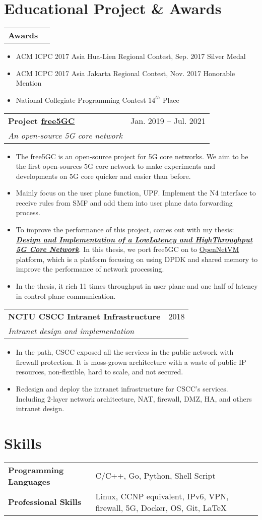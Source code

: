 \documentclass[letterpaper,11pt]{article}
\makeatletter
\newcommand{\resumeItemTwo}[1]{
  \item\small{
    {#1 \vspace{-2pt}}
  }
}
\newcommand{\resumeSubheading}[4]{
  \vspace{1pt}%
    \begin{tabular*}{0.97\textwidth}{l@{\extracolsep{\fill}}r}
      \textbf{#1} & #2 \\
      \textit{\small#3} & \textit{\small #4} \\
    \end{tabular*}\vspace{-5pt}
}
\newcommand{\resumeSubheadingOne}[2]{
  \vspace{-1pt}%
    \begin{tabular*}{0.97\textwidth}{l@{\extracolsep{\fill}}r}
      \textbf{#1} & #2 \\
    \end{tabular*}\vspace{-5pt}
}
\newcommand{\resumeSubHeadingListStart}{}%
\newcommand{\resumeSubHeadingListEnd}{}%
\newcommand{\resumeItemListStart}{\begin{itemize}}
\newcommand{\resumeItemListEnd}{\end{itemize}\vspace{-5pt}}
\makeatother
\begin{document}
\section{Educational Project \& Awards}
  \resumeSubHeadingListStart
     \resumeSubheadingOne
     {Awards}{}
      \resumeItemListStart
        \resumeItemTwo{ACM ICPC 2017 Asia Hua-Lien Regional Contest, Sep. 2017}{Silver Medal}
        \resumeItemTwo{ACM ICPC 2017 Asia Jakarta Regional Contest, Nov. 2017}{Honorable Mention}
        \resumeItemTwo{National Collegiate Programming Contest}{$14^{th}$ Place}
      \resumeItemListEnd
    \resumeSubheading
     {Project \href{https://www.free5gc.org/}{free5GC}}{Jan. 2019 -- Jul. 2021}
      {An open-source 5G core network}{}
      \resumeItemListStart
        \resumeItemTwo{The free5GC is an open-source project for 5G core networks. We aim to be the first open-sources 5G core network to make experiments and developments on 5G core quicker and easier than before.}
        \resumeItemTwo{Mainly focus on the user plane function, UPF. Implement the N4 interface to receive rules from SMF and add them into user plane data forwarding process.}
        \resumeItemTwo{To improve the performance of this project, comes out with my thesis: \textbf{\textit{\href{https://hdl.handle.net/11296/44vnys}{Design and Implementation of a Low­Latency and High­Throughput 5G Core Network}}}. In this thesis, we port free5GC on to \href{http://sdnfv.github.io/onvm/}{OpenNetVM} platform, which is a platform focusing on using DPDK and shared memory to improve the performance of network processing.}
        \resumeItemTwo{In the thesis, it rich 11 times throughput in user plane and one half of latency in control plane communication.}
      \resumeItemListEnd
    \resumeSubheading
     {NCTU CSCC Intranet Infrastructure}{2018}
      {Intranet design and implementation}{}
      \resumeItemListStart
        \resumeItemTwo{In the path, CSCC exposed all the services in the public network with firewall protection. It is moss-grown architecture with a waste of public IP resources, non-flexible, hard to scale, and not secured.}
        \resumeItemTwo{Redesign and deploy the intranet infrastructure for CSCC's services. Including 2-layer network architecture, NAT, firewall, DMZ, HA, and others intranet design.}
      \resumeItemListEnd
  \resumeSubHeadingListEnd



\section{Skills}
    \begin{tabular}{ l l }
     \textbf{Programming Languages}\qquad \qquad \qquad & C/C++, Go, Python, Shell Script\\
     \textbf{Professional Skills} & Linux, CCNP equivalent, IPv6, VPN, firewall, 5G, Docker, OS, Git, \LaTeX\\
     \end{tabular}
\end{document}
